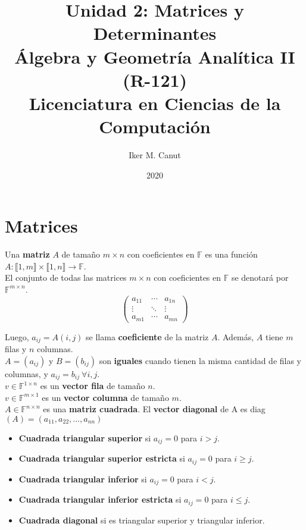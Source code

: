 \documentclass[11pt,a4paper]{article}
\author{Iker M. Canut}
\title{Unidad 2: Matrices y Determinantes\\ \'Algebra y Geometr\'ia Anal\'itica II (R-121)\\Licenciatura en Ciencias de la Computaci\'on}
\date{2020}
\begin{document}
\maketitle
\newpage

\section{Matrices}
Una \textbf{matriz} $A$ de tamaño $m \times n$ con coeficientes en $\mathbb{F}$ es una funci\'on $A : \llbracket 1, m \rrbracket \times \llbracket 1,n \rrbracket \rightarrow \mathbb{F}$. \\ El conjunto de todas las matrices $m \times n$ con coeficientes en $\mathbb{F}$ se denotar\'a por $\mathbb{F}^{m \times n}$.
$$
\begin{pmatrix}
a_{11} & \cdots & a_{1n} \\
\vdots & \ddots & \vdots \\
a_{m1} & \cdots & a_{mn}
\end{pmatrix}
$$

Luego, $a_{ij} = A(i,j)$ se llama \textbf{coeficiente} de la matriz $A$. Adem\'as, $A$ tiene $m$ filas y $n$ columnas. \\ $A = (a_{ij})$ y $B = (b_{ij})$ son \textbf{iguales} cuando tienen la misma cantidad de filas y columnas, y $a_{ij} = b_{ij}\ \forall i, j$.\\

$v \in \mathbb{F}^{1 \times n}$ es un \textbf{vector fila} de tamaño $n$.\\
$v \in \mathbb{F}^{m \times 1}$ es un \textbf{vector columna} de tamaño $m$.\\
$A \in \mathbb{F}^{n \times n}$ es una \textbf{matriz cuadrada}. El \textbf{vector diagonal} de A es diag$(A) = (a_{11}, a_{22}, ..., a_{nn})$
\begin{itemize}
\itemsep-0.3em 
\item \textbf{Cuadrada triangular superior} si $a_{ij} = 0$ para $i > j$.
\item \textbf{Cuadrada triangular superior estricta} si $a_{ij} = 0$ para $i \geq j$.
\item \textbf{Cuadrada triangular inferior} si $a_{ij} = 0$ para $i < j$.
\item \textbf{Cuadrada triangular inferior estricta} si $a_{ij} = 0$ para $i \leq j$.
\item \textbf{Cuadrada diagonal} si es triangular superior y triangular inferior.
\end{itemize}
\end{document}
